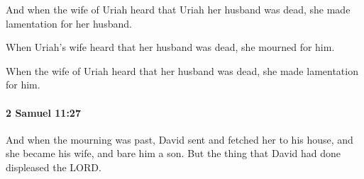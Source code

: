 			\begin{versebox}
					\item[BHS] 
					\item[ASV] And when the wife of Uriah heard that Uriah her husband was dead, she made lamentation for her husband.
					\item[NIV] When Uriah’s wife heard that her husband was dead, she mourned for him.
					\item[NRSV] When the wife of Uriah heard that her husband was dead, she made lamentation for him.
			\end{versebox}

		\paragraph{2 Samuel 11:27} %
			\label{2SAMUEL-11-27}

			And when the mourning was past, David sent and fetched her to his house, and she became his wife, and bare him a son. But the thing that David had done displeased the LORD.

